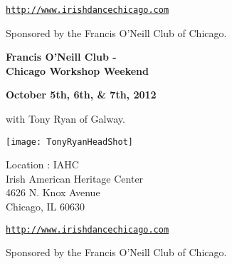 \documentclass[10pt,
lettterpaper]{leaflet}
\begin{document}
\vspace*{2em}
\href{http://www.irishdancechicago.com}{\tt http://www.irishdancechicago.com} 

{\small Sponsored by the Francis O'Neill Club of Chicago.}

\pagebreak
\begin{center}
{\Large\textbf{Francis O'Neill Club - \\ Chicago Workshop Weekend}}\\ 
\end{center}

\begin{center}
\textbf{October 5th, 6th, \&  7th, 2012} 
\end{center}

\vspace*{0.25em}
with Tony Ryan of Galway.

\vspace*{0.45em}
\begin{center}
\texttt{[image: TonyRyanHeadShot]}
\end{center}

\vspace*{2.5em}
Location : IAHC\\
Irish American Heritage Center\\
4626 N. Knox Avenue\\
Chicago, IL  60630 

\vspace*{2em}
\href{http://www.irishdancechicago.com}{\tt http://www.irishdancechicago.com} 

{\small Sponsored by the Francis O'Neill Club of Chicago.}
\end{document}

